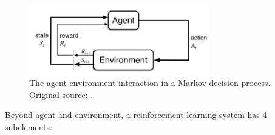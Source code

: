 \documentclass{article}
\begin{document}
\begin{figure}[h]
    \centering
    \includegraphics[width=0.7\textwidth]{img/reinforcement-learning-interaction.jpg}
    \caption{The agent-environment interaction in a Markov decision process.
    Original source: \cite{Sutton1998}.}
    \label{fig:rl-interaction}
\end{figure}

Beyond agent and environment, a reinforcement learning system has 4 subelements:
\end{document}
